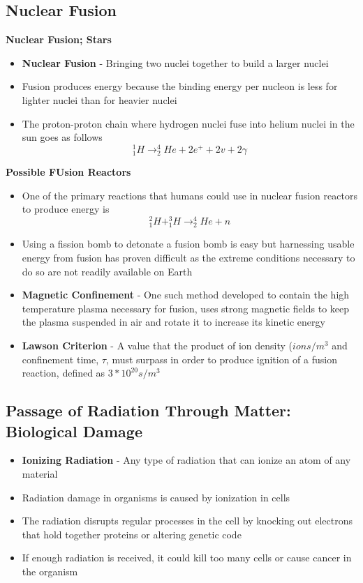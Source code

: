 \subsection{Nuclear Fusion}
\textbf{Nuclear Fusion; Stars}
\begin{itemize}
    \item \textbf{Nuclear Fusion} - Bringing two nuclei together to build a larger nuclei 
    \item Fusion produces energy because the binding energy per nucleon is less for lighter nuclei than for heavier nuclei
    \item The proton-proton chain where hydrogen nuclei fuse into helium nuclei in the sun goes as follows \[^1_1H\rightarrow ^4_2He+2e^++2v+2\gamma\]
\end{itemize}

\textbf{Possible FUsion Reactors}
\begin{itemize}
    \item One of the primary reactions that humans could use in nuclear fusion reactors to produce energy is \[^2_1H+^3_1H\rightarrow^4_2He+n\]
    \item Using a fission bomb to detonate a fusion bomb is easy but harnessing usable energy from fusion has proven difficult as the extreme conditions necessary to do so are not readily available on Earth
    \item \textbf{Magnetic Confinement} - One such method developed to contain the high temperature plasma necessary for fusion, uses strong magnetic fields to keep the plasma suspended in air and rotate it to increase its kinetic energy
    \item \textbf{Lawson Criterion} - A value that the product of ion density (\(ions/m^3\) and confinement time, \(\tau\), must surpass in order to produce ignition of a fusion reaction, defined as \(3*10^20s/m^3\)
\end{itemize}

\subsection{Passage of Radiation Through Matter: Biological Damage}
\begin{itemize}
    \item \textbf{Ionizing Radiation} - Any type of radiation that can ionize an atom of any material
    \item Radiation damage in organisms is caused by ionization in cells
    \item The radiation disrupts regular processes in the cell  by knocking out electrons that hold together proteins or altering genetic code
    \item If enough radiation is received, it could kill too many cells or cause cancer in the organism
\end{itemize}

